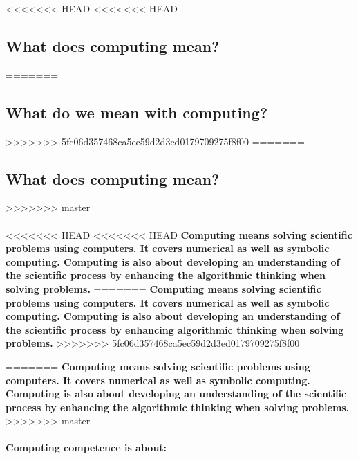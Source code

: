 \documentclass[%
<<<<<<< HEAD
<<<<<<< HEAD
oneside,                 %
final,                   %
=======
twoside,                 %
final,                   %
>>>>>>> 5fc06d357468ca5ec59d2d3ed0179709275f8f00
=======
oneside,                 %
final,                   %
>>>>>>> master
10pt]{article}
\begin{document}
\noindent





<<<<<<< HEAD
<<<<<<< HEAD
\subsection*{What does computing mean?}

=======
\subsection*{What do we mean with computing?}
>>>>>>> 5fc06d357468ca5ec59d2d3ed0179709275f8f00
=======
\subsection*{What does computing mean?}

>>>>>>> master

\paragraph{}

<<<<<<< HEAD
<<<<<<< HEAD
\textbf{Computing means solving scientific problems using computers. It covers numerical as well as symbolic computing. Computing is also about developing an understanding of the scientific process by enhancing the algorithmic thinking when solving problems.}
=======
\textbf{Computing means solving scientific problems using computers. It covers numerical as well as symbolic computing. Computing is also about developing an understanding of the scientific process by enhancing algorithmic thinking when solving problems.}
>>>>>>> 5fc06d357468ca5ec59d2d3ed0179709275f8f00

=======
\textbf{Computing means solving scientific problems using computers. It covers numerical as well as symbolic computing. Computing is also about developing an understanding of the scientific process by enhancing the algorithmic thinking when solving problems.}
>>>>>>> master




\paragraph{Computing competence is about:}
\end{document}
